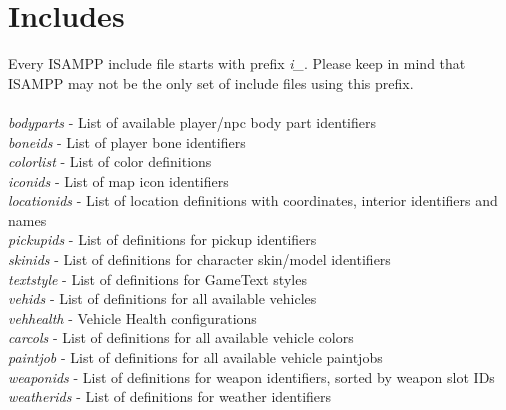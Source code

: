 \documentclass{article}
\begin{document}
\section{Includes}
Every ISAMPP include file starts with prefix \textit{i\_}. Please keep in mind that ISAMPP may not be the only set of include files using this prefix.
\\
\\
\textit{bodyparts} - List of available player/npc body part identifiers
\\
\textit{boneids} - List of player bone identifiers
\\
\textit{colorlist} - List of color definitions
\\
\textit{iconids} - List of map icon identifiers
\\
\textit{locationids} - List of location definitions with coordinates, interior identifiers and names
\\
\textit{pickupids} - List of definitions for pickup identifiers
\\
\textit{skinids} - List of definitions for character skin/model identifiers
\\
\textit{textstyle} - List of definitions for GameText styles
\\
\textit{vehids} - List of definitions for all available vehicles
\\
\textit{vehhealth} - Vehicle Health configurations
\\
\textit{carcols} - List of definitions for all available vehicle colors
\\
\textit{paintjob} - List of definitions for all available vehicle paintjobs
\\
\textit{weaponids} - List of definitions for weapon identifiers, sorted by weapon slot IDs
\\
\textit{weatherids} - List of definitions for weather identifiers


\newpage
\end{document}
